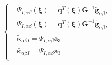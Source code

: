\begin{equation}
\left \{
\begin{split}
&\tilde{\Psi}_{I,\alpha\beta}(\boldsymbol \xi) = \boldsymbol q^T(\boldsymbol \xi) \boldsymbol G^{-1} \tilde{\boldsymbol g}_{\alpha\beta I} \\
&\bar{\Psi}_{I,\alpha\beta}(\boldsymbol \xi) = \boldsymbol q^T(\boldsymbol \xi) \boldsymbol G^{-1} \tilde{\boldsymbol g}_{\alpha\beta I} \\
&\tilde{\boldsymbol \kappa}_{\alpha\beta I} = \tilde \Psi_{I,\alpha\beta}\boldsymbol a_3 \\
&\bar {\boldsymbol \kappa}_{\alpha\beta I} = \bar \Psi_{I,\alpha\beta}\boldsymbol a_3 \\
\end{split}
\right .
\end{equation}

